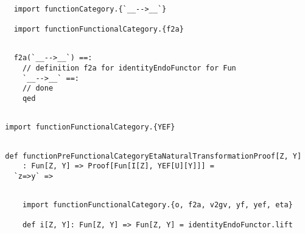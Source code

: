 \documentclass[11pt]{article}
\begin{document}
\vspace{6pt}
\begin{mdframed}[backgroundcolor=lightgray!20] 
\begin{lstlisting}

    import functionCategory.{`__-->__`}

    import functionFunctionalCategory.{f2a}
\end{lstlisting}
\end{mdframed}
\vspace{6pt}
\begin{mdframed}[backgroundcolor=lightgray!20] 
\begin{lstlisting} 
    
    f2a(`__-->__`) ==:
      // definition f2a for identityEndoFunctor for Fun
      `__-->__` ==:
      // done
      qed
\end{lstlisting}
\end{mdframed}
\vspace{6pt}
\begin{mdframed}[backgroundcolor=lightgray!20] 
\begin{lstlisting} 

  import functionFunctionalCategory.{YEF}

\end{lstlisting}
\end{mdframed}
\vspace{6pt}
\begin{mdframed}[backgroundcolor=lightgray!20] 
\begin{lstlisting} 
  
  def functionPreFunctionalCategoryEtaNaturalTransformationProof[Z, Y]
      : Fun[Z, Y] => Proof[Fun[I[Z], YEF[U][Y]]] =
    `z=>y` =>
\end{lstlisting}
\end{mdframed}
\vspace{6pt}
\begin{mdframed}[backgroundcolor=lightgray!20] 
\begin{lstlisting}

      import functionFunctionalCategory.{o, f2a, v2gv, yf, yef, eta}

      def i[Z, Y]: Fun[Z, Y] => Fun[Z, Y] = identityEndoFunctor.lift
\end{lstlisting}
\end{mdframed}
\vspace{6pt}
\clearpage
\end{document}
